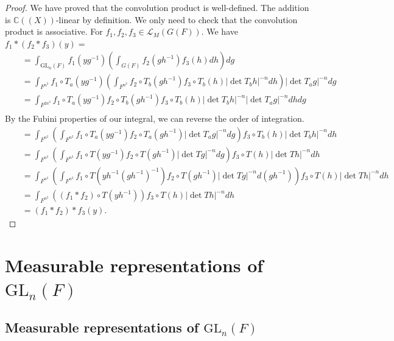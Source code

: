 \documentclass{amsart}
\theoremstyle{definition}
\theoremstyle{remark}
\numberwithin{equation}{section}
\def  \GL        {\mathrm{GL}}
\def  \cl       {\mathcal{L}}
\def  \bc       {\mathbb{C}}
\begin{document}
\begin{proof}
	We have proved that the convolution product is well-defined. The addition is $\bc((X))$-linear by definition. We only need to check that the convolution product is associative. For $f_1, f_2, f_3 \in \cl_M(G(F))$. We have 	$f_1  *(  f_2  * f_3) (y)=$
	\begin{eqnarray*}
        &&= \int_{\GL_n(F)} f_1(y g^{-1}) \left(  \int_{G(F)}  f_2(gh^{-1}) f_3(h) dh  \right) dg  \\
	                                  && =\int_{F^{n^2}}  f_1 \circ T_a (y g^{-1})  \left(  \int_{F^{n^2}}      f_2 \circ T_b(gh^{-1}) f_3\circ T_b(h) |\det T_b h|^{-n} dh  \right)  |\det T_a g|^{-n}dg    \\
	                                  && =\int_{F^{2n^2}}    f_1 \circ T_a (y g^{-1}) f_2 \circ  T_b(gh^{-1})  f_3  \circ T_b(h)  |\det T_bh|^{-n}  |\det T_ag|^{-n} dh  dg \\                    
	   \end{eqnarray*}
	   By the Fubini properties of our integral, we can reverse the order of integration.
	   \begin{eqnarray*}
	                                  && =\int_{F^{n^2}}    \left(   \int_{F^{n^2}}   f_1 \circ T_a(y g^{-1}) f_2 \circ  T_a(gh^{-1})   |\det T_a g|^{-n} dg  \right ) f_3 \circ T_b(h)  |\det T_bh|^{-n}    dh \\
	                                  && = \int_{F^{n^2}}  \left( \int_{F^{n^2 }}f_1 \circ T(y g^{-1}) f_2 \circ  T(gh^{-1})   |\det T g|^{-n} dg \right) f_3 \circ T(h)  |\det T h|^{-n} dh  \\
	                                    && = \int_{F^{n^2}}  \left( \int_{F^{n^2 }}f_1 \circ T(yh^{-1} (gh^{-1})^{-1}) f_2 \circ  T(gh^{-1})   |\det Tg|^{-n} d(gh^{-1}) \right) f_3 \circ T(h)  |\det T h|^{-n} dh  \\
	                                    && = \int_{F^{n^2}}  \left( (f_1 * f_2)  \circ T( yh^{-1})\right) f_3 \circ T(h)  |\det T h|^{-n} dh  \\
	                                    &&= (f_1 * f_2) * f_3(y).
   \end{eqnarray*}
\end{proof}
\section{Measurable representations of $\GL_n(F)$}

\subsection{Measurable representations of $\GL_n(F)$}
\end{document}
